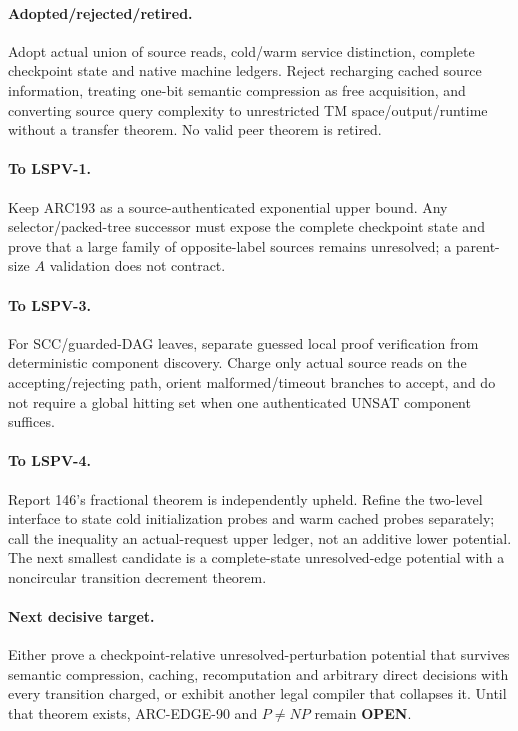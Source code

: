 \documentclass[11pt]{article}
\newcommand{\OPEN}{\textbf{OPEN}}
\begin{document}
\paragraph{Adopted/rejected/retired.}
Adopt actual union of source reads, cold/warm service distinction, complete checkpoint state and native machine ledgers.  Reject recharging cached source information, treating one-bit semantic compression as free acquisition, and converting source query complexity to unrestricted TM space/output/runtime without a transfer theorem.  No valid peer theorem is retired.

\paragraph{To LSPV-1.}
Keep ARC193 as a source-authenticated exponential upper bound.  Any selector/packed-tree successor must expose the complete checkpoint state and prove that a large family of opposite-label sources remains unresolved; a parent-size $A$ validation does not contract.

\paragraph{To LSPV-3.}
For SCC/guarded-DAG leaves, separate guessed local proof verification from deterministic component discovery.  Charge only actual source reads on the accepting/rejecting path, orient malformed/timeout branches to accept, and do not require a global hitting set when one authenticated UNSAT component suffices.

\paragraph{To LSPV-4.}
Report 146's fractional theorem is independently upheld.  Refine the two-level interface to state cold initialization probes and warm cached probes separately; call the inequality an actual-request upper ledger, not an additive lower potential.  The next smallest candidate is a complete-state unresolved-edge potential with a noncircular transition decrement theorem.

\paragraph{Next decisive target.}
Either prove a checkpoint-relative unresolved-perturbation potential that survives semantic compression, caching, recomputation and arbitrary direct decisions with every transition charged, or exhibit another legal compiler that collapses it.  Until that theorem exists, ARC-EDGE-90 and $P\ne NP$ remain \OPEN.
\end{document}
